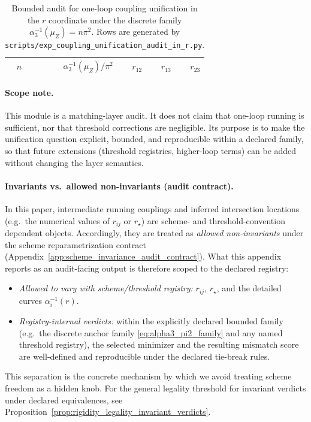 %

\begin{table}[H]
\centering
\small
\setlength{\tabcolsep}{8pt}
\renewcommand{\arraystretch}{1.15}
\begin{tabular}{rrrrr}
\toprule
$n$ & $\alpha_3^{-1}(\mu_Z)/\pi^2$ & $r_{12}$ & $r_{13}$ & $r_{23}$ \\
\midrule
%
\end{tabular}
\caption{Bounded audit for one-loop coupling unification in the $r$ coordinate under the discrete family $\alpha_3^{-1}(\mu_Z)=n\pi^2$.
Rows are generated by \texttt{scripts/exp\_coupling\_unification\_audit\_in\_r.py}.}
\label{tab:coupling_unification_audit_in_r}
\end{table}

\paragraph{Scope note.}
\AuditTag This module is a matching-layer audit.
It does not claim that one-loop running is sufficient, nor that threshold corrections are negligible.
Its purpose is to make the unification question explicit, bounded, and reproducible within a declared family, so that future extensions (threshold registries, higher-loop terms) can be added without changing the layer semantics.

\paragraph{Invariants vs.\ allowed non-invariants (audit contract).}
\AuditTag In this paper, intermediate running couplings and inferred intersection locations (e.g.\ the numerical values of $r_{ij}$ or $r_\star$) are scheme- and threshold-convention dependent objects.
Accordingly, they are treated as \emph{allowed non-invariants} under the scheme reparametrization contract (Appendix~\ref{app:scheme_invariance_audit_contract}).
What this appendix reports as an audit-facing output is therefore scoped to the declared registry:
\begin{itemize}
\item \AuditTag \emph{Allowed to vary with scheme/threshold registry:} $r_{ij}$, $r_\star$, and the detailed curves $\alpha_i^{-1}(r)$.
\item \AuditTag \emph{Registry-internal verdicts:} within the explicitly declared bounded family (e.g.\ the discrete anchor family \eqref{eq:alpha3_pi2_family} and any named threshold registry), the selected minimizer and the resulting mismatch score are well-defined and reproducible under the declared tie-break rules.
\end{itemize}
\AuditTag This separation is the concrete mechanism by which we avoid treating scheme freedom as a hidden knob.
For the general legality threshold for invariant verdicts under declared equivalences, see Proposition~\ref{prop:rigidity_legality_invariant_verdicts}.

